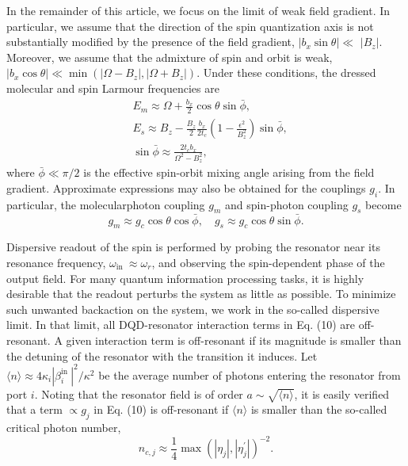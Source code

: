 \documentclass[12pt]{article}
\begin{document}
In the remainder of this article, we focus on the limit of weak field gradient. In particular, we assume that the direction of the spin quantization axis is not substantially modified by the presence of the field gradient, $\left|b_x \sin \theta\right| \ll$ $\left|B_z\right|$. Moreover, we assume that the admixture of spin and orbit is weak, $\left|b_x \cos \theta\right| \ll \min \left(\left|\Omega-B_z\right|,\left|\Omega+B_z\right|\right)$. Under these conditions, the dressed molecular and spin Larmour frequencies are
\begin{equation}\label{eq:Larmour_frequencies}
    \begin{aligned}
        & E_m \approx \Omega+\frac{b_x}{2} \cos \theta \sin \bar{\phi}, \\
        & E_s \approx B_z-\frac{B_z}{2} \frac{b_x}{2 t_c}\left(1-\frac{\epsilon^2}{B_z^2}\right) \sin \bar{\phi}, \\
        & \sin \bar{\phi} \approx \frac{2 t_c b_x}{\Omega^2-B_z^2},
    \end{aligned}
\end{equation}
where $\bar{\phi} \ll \pi / 2$ is the effective spin-orbit mixing angle arising from the field gradient. Approximate expressions may also be obtained for the couplings $g_i$. In particular, the molecularphoton coupling $g_m$ and spin-photon coupling $g_s$ become
\begin{equation}\label{eq:couplings}
    g_m \approx g_c \cos \theta \cos \bar{\phi}, \quad g_s \approx g_c \cos \theta \sin \bar{\phi} .
\end{equation}

Dispersive readout of the spin is performed by probing the resonator near its resonance frequency, $\omega_{\text {in }} \approx \omega_r$, and observing the spin-dependent phase of the output field. For many quantum information processing tasks, it is highly desirable that the readout perturbs the system as little as possible. To minimize such unwanted backaction on the system, we work in the so-called dispersive limit. In that limit, all DQD-resonator interaction terms in Eq. (10) are off-resonant. A given interaction term is off-resonant if its magnitude is smaller than the detuning of the resonator with the transition it induces. Let $\langle n\rangle \approx 4 \kappa_i\left|\beta_i^{\text {in }}\right|^2 / \kappa^2$ be the average number of photons entering the resonator from port $i$. Noting that the resonator field is of order $a \sim \sqrt{\langle n\rangle}$, it is easily verified that a term $\propto g_j$ in Eq. (10) is off-resonant if $\langle n\rangle$ is smaller than the so-called critical photon number,
$$
n_{c, j} \approx \frac{1}{4} \max \left(\left|\eta_j\right|,\left|\eta_j^{\prime}\right|\right)^{-2} .
$$
\end{document}
